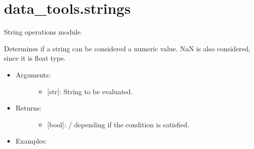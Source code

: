 \documentclass[letterpaper,10pt,english]{sphinxmanual}
\begin{document}
\label{\detokenize{strings:module-data_tools.strings}}

\section{data\_tools.strings}
\label{\detokenize{strings::doc}}\label{\detokenize{strings:data-tools-strings}}
String operations module.

\begin{fulllineitems}
\label{\detokenize{strings:data_tools.strings.is_numeric}}
Determines if a string can be considered a numeric value. NaN is
also considered, since it is float type.
\begin{itemize}
\item {} \begin{description}
\item[{Arguments:}] \leavevmode\begin{itemize}
\item {} 
 {[}str{]}: String to be evaluated.

\end{itemize}

\end{description}

\item {} \begin{description}
\item[{Returns:}] \leavevmode\begin{itemize}
\item {} 
{[}bool{]}: / depending if the condition is
satisfied.

\end{itemize}

\end{description}

\item {} \begin{description}
\item[{Examples:}] \leavevmode
{}%
\begin{sphinxVerbatim}[commandchars=\\\{\}]
\end{sphinxVerbatim}


\end{description}
\end{itemize}
\end{fulllineitems}
\end{document}
